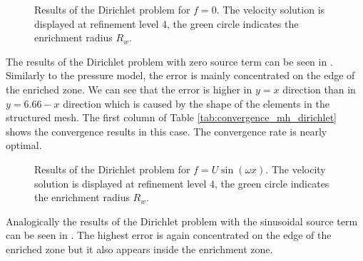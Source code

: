 %
\begin{figure}[!htb]
    \centering
    \caption[Dirichlet problem results, zero source term.]
    {Results of the Dirichlet problem for $f=0$. The velocity solution is displayed at refinement level 4,
    the green circle indicates the enrichment radius $R_w$.}
    \label{fig:mh_dirichlet_zero_source}
\end{figure}
The results of the Dirichlet problem with zero source term can be seen in .
Similarly to the pressure model, the error is mainly concentrated on the edge of the enriched zone.
We can see that the error is higher in $y=x$ direction than in $y=6.66-x$ direction which is caused by the shape of the
elements in the structured mesh.
The first column of Table \ref{tab:convergence_mh_dirichlet} shows the convergence results in this case.
The convergence rate is nearly optimal.
\begin{figure}[!htb]
    \centering
    \caption[Dirichlet problem results, nonzero source term.]
    {Results of the Dirichlet problem for $f=U\sin(\omega x)$. The velocity solution is displayed at refinement level 4,
    the green circle indicates the enrichment radius $R_w$.}
    \label{fig:mh_dirichlet_source}
\end{figure}
%
Analogically the results of the Dirichlet problem with the sinusoidal source term can be seen in .
The highest error is again concentrated on the edge of the enriched zone but it also appears
inside the enrichment zone. 


